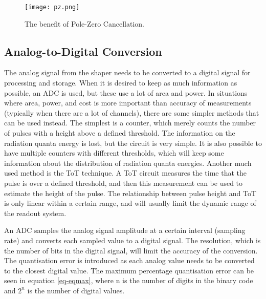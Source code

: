 \documentclass[../main/thesis.tex]{subfiles}
\begin{document}
\begin{figure}[h!]%
	\centering
	\texttt{[image: pz.png]}
	\caption{The benefit of Pole-Zero Cancellation. \citep{ORTEC} }
	\label{fig-shaper-pz}
\end{figure}


\subsection{Analog-to-Digital Conversion}
\label{t-adc}
The analog signal from the shaper needs to be converted to a digital signal for processing and storage. When it is desired to keep as much information as possible, an \acrfull{ADC} is used, but these use a lot of area and power. In situations where area, power, and cost is more important than accuracy of measurements (typically when there are a lot of channels), there are some simpler methods that can be used instead. The simplest is a counter, which merely counts the number of pulses with a height above a defined threshold. The information on the radiation quanta energy is lost, but the circuit is very simple. It is also possible to have multiple counters with different thresholds, which will keep some information about the distribution of radiation quanta energies. Another much used method is the \gls{ToT} technique. A \gls{ToT} circuit measures the time that the pulse is over a defined threshold, and then this measurement can be used to estimate the height of the pulse. The relationship between pulse height and \gls{ToT} is only linear within a certain range, and will usually limit the dynamic range of the readout system. \citep[chap. 6]{ToT}


An \gls{ADC} samples the analog signal amplitude at a certain interval (sampling rate) and converts each sampled value to a digital signal. The resolution, which is the number of bits in the digital signal, will limit the accuracy of the conversion. The quantisation error is introduced as each analog value needs to be converted to the closest digital value. The maximum percentage quantisation error can be seen in equation \ref{eq-eqmax}, where n is the number of digits in the binary code and $2^n$ is the number of digital values. \citep[chap. 10]{Bentley}
\end{document}
